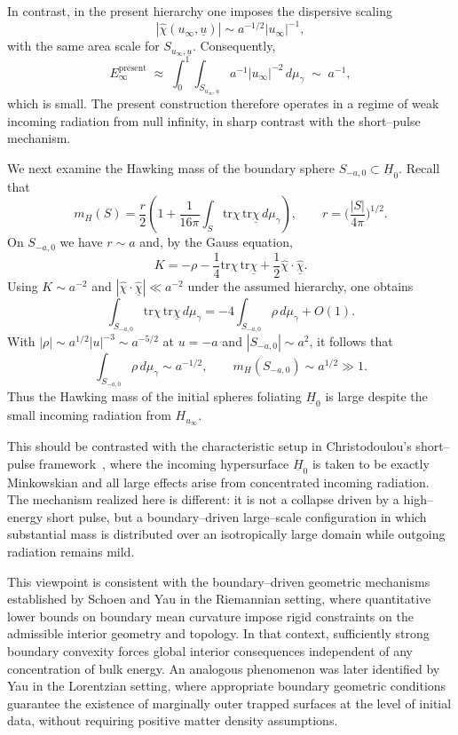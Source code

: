 \documentclass{amsart}
\newcommand{\ubar}{\underline{u}}
\newcommand{\tr}{\mbox{tr}}
\begin{document}
\noindent In contrast, in the present hierarchy one imposes the dispersive scaling
\[
|\hat\chi(u_\infty,\ubar)|\sim a^{-1/2}|u_\infty|^{-1},
\]
with the same area scale for $S_{u_\infty,\ubar}$. Consequently,
\[
E_\infty^{\mathrm{present}}
\;\approx\;
\int_{0}^{1}\!\int_{S_{u_\infty,\ubar}}
a^{-1}|u_\infty|^{-2}\, d\mu_{\gamma}
\;\sim\;
a^{-1},
\]
which is small. The present construction therefore operates in a regime of weak incoming radiation from null infinity, in sharp contrast with the short–pulse mechanism.

\medskip

\noindent We next examine the Hawking mass of the boundary sphere $S_{-a,0}\subset \underline H_{0}$. Recall that
\[
m_H(S)
=
\frac{r}{2}\left(1+\frac{1}{16\pi}\int_{S}\tr\chi\,\tr\underline\chi\, d\mu_{\gamma}\right),
\qquad
r=\Big(\frac{|S|}{4\pi}\Big)^{1/2}.
\]
On $S_{-a,0}$ we have $r\sim a$ and, by the Gauss equation,
\[
K = -\rho - \frac14 \tr\chi\,\tr\underline\chi + \frac12 \hat\chi\cdot\underline{\hat\chi}.
\]
Using $K\sim a^{-2}$ and $|\hat\chi\cdot\underline{\hat\chi}|\ll a^{-2}$ under the assumed hierarchy, one obtains
\[
\int_{S_{-a,0}}\tr\chi\,\tr\underline\chi\, d\mu_{\gamma}
=
-4\int_{S_{-a,0}}\rho\, d\mu_{\gamma}
+ O(1).
\]
With $|\rho|\sim a^{1/2}|u|^{-3}\sim a^{-5/2}$ at $u=-a$ and $|S_{-a,0}|\sim a^{2}$, it follows that
\[
\int_{S_{-a,0}}\rho\, d\mu_{\gamma}\sim a^{-1/2},
\qquad
m_H(S_{-a,0})\sim a^{1/2}\gg 1.
\]
Thus the Hawking mass of the initial spheres foliating $\underline H_{0}$ is large despite the small incoming radiation from $H_{u_\infty}$.

\medskip

\noindent This should be contrasted with the characteristic setup in Christodoulou’s short–pulse framework~\cite{christodoulou}, where the incoming hypersurface $\underline H_{0}$ is taken to be exactly Minkowskian and all large effects arise from concentrated incoming radiation. The mechanism realized here is different: it is not a collapse driven by a high–energy short pulse, but a boundary–driven large–scale configuration in which substantial mass is distributed over an isotropically large domain while outgoing radiation remains mild.

\noindent This viewpoint is consistent with the boundary–driven geometric mechanisms established by Schoen and Yau \cite{syincompressible} in the Riemannian setting, where quantitative lower bounds on boundary mean curvature impose rigid constraints on the admissible interior geometry and topology. In that context, sufficiently strong boundary convexity forces global interior consequences independent of any concentration of bulk energy. An analogous phenomenon was later identified by Yau in the Lorentzian setting, where appropriate boundary geometric conditions guarantee the existence of marginally outer trapped surfaces at the level of initial data, without requiring positive matter density assumptions.
\end{document}
